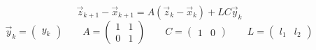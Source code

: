 \documentclass{article}
\begin{document}
\thispagestyle{empty}

$$
\vec{z}_{k+1}-\vec{x}_{k+1} = A(\vec{z}_k-\vec{x}_k) + LC \vec{y}_k
$$
$$
\vec{y}_k=\begin{pmatrix}y_k\end{pmatrix}\qquad A=\begin{pmatrix} 1 & 1 \\ 0 & 1\end{pmatrix} \qquad C=\begin{pmatrix}1 & 0\end{pmatrix} \qquad L=\begin{pmatrix}l_1 & l_2\end{pmatrix}
$$
\end{document}
